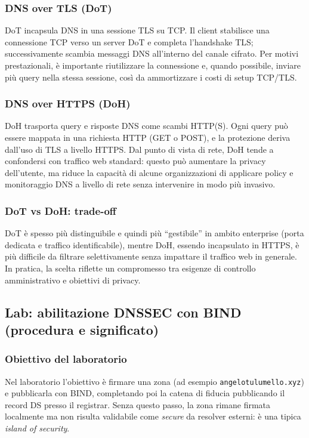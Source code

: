 \subsubsection{DNS over TLS (DoT)}
DoT incapsula DNS in una sessione TLS su TCP. Il client stabilisce una connessione TCP verso un server DoT e completa l’handshake TLS; successivamente scambia messaggi DNS all’interno del canale cifrato. Per motivi prestazionali, è importante riutilizzare la connessione e, quando possibile, inviare più query nella stessa sessione, così da ammortizzare i costi di setup TCP/TLS.

\subsubsection{DNS over HTTPS (DoH)}
DoH trasporta query e risposte DNS come scambi HTTP(S). Ogni query può essere mappata in una richiesta HTTP (GET o POST), e la protezione deriva dall’uso di TLS a livello HTTPS. Dal punto di vista di rete, DoH tende a confondersi con traffico web standard: questo può aumentare la privacy dell’utente, ma riduce la capacità di alcune organizzazioni di applicare policy e monitoraggio DNS a livello di rete senza intervenire in modo più invasivo.

\subsubsection{DoT vs DoH: trade-off}
DoT è spesso più distinguibile e quindi più “gestibile” in ambito enterprise (porta dedicata e traffico identificabile), mentre DoH, essendo incapsulato in HTTPS, è più difficile da filtrare selettivamente senza impattare il traffico web in generale. In pratica, la scelta riflette un compromesso tra esigenze di controllo amministrativo e obiettivi di privacy.


\subsection{Lab: abilitazione DNSSEC con BIND (procedura e significato)}

\subsubsection{Obiettivo del laboratorio}
Nel laboratorio l’obiettivo è firmare una zona (ad esempio \texttt{angelotulumello.xyz}) e pubblicarla con BIND, completando poi la catena di fiducia pubblicando il record DS presso il registrar. Senza questo passo, la zona rimane firmata localmente ma non risulta validabile come \emph{secure} da resolver esterni: è una tipica \emph{island of security}.

